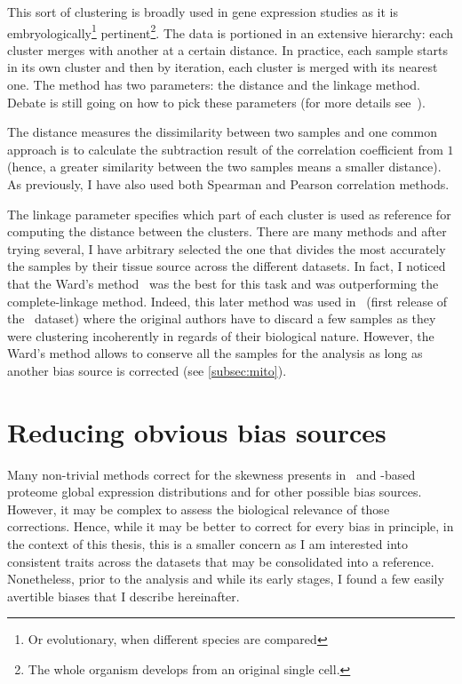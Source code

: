 This sort of clustering is broadly used in gene expression studies as it is
embryologically\footnote{Or evolutionary, when different species are compared}
pertinent\footnote{The whole organism develops from
an original single cell.}. The data is portioned in an extensive hierarchy:
each cluster merges with another at a certain distance.
In practice, each sample starts in its own cluster and then
by iteration, each cluster is merged with its nearest one.
The method has two parameters: the distance and the linkage method.
Debate is still going on how to pick these parameters (for more details
see~).

The distance measures the dissimilarity between two samples and one common
approach is to calculate the subtraction result of
the correlation coefficient from $1$ (hence, a greater similarity between the two
samples means a smaller distance). As previously, I have also used both Spearman
and Pearson correlation methods.

The linkage parameter specifies which part of each cluster is used as reference
for computing the distance between the clusters. There are many methods and after
trying several, I have arbitrary selected the one that divides the most accurately
the samples by their tissue source across the different datasets.
In fact, I noticed that the Ward's method~
was the best for this task and was outperforming the complete-linkage method.
Indeed, this later method was used in~
(first release of the \uhlen\ dataset) where
the original authors have to discard a few samples as they were clustering
incoherently in regards of their biological nature.
However, the Ward's method allows to conserve all the samples for the analysis
as long as another bias source is corrected (see \cref{subsec:mito}).


\section{Reducing obvious bias sources}

Many non-trivial methods correct for the skewness presents in
\Rnaseq\ and \ms-based proteome global expression distributions
and for other possible bias sources.
However, it may be complex to assess the biological relevance of those corrections.
Hence, while it may be better to correct for every bias in principle,
in the context of this thesis, this is a smaller concern as I am interested into
consistent traits across the datasets that may be consolidated into a reference.
Nonetheless, prior to the analysis and while its early stages,
I found a few easily avertible biases that I describe hereinafter.


